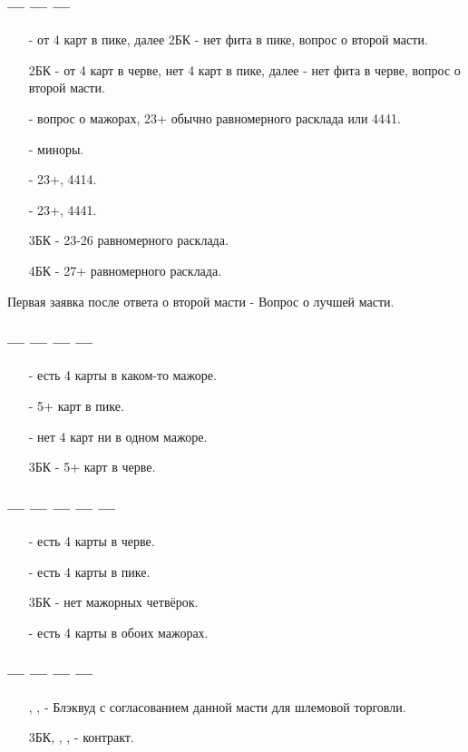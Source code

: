 \documentclass{article}
\begin{document}
\subsubsection{ ---  ---  --- }
\begin{enumerate}
    \item[\sp{2}] - от 4 карт в пике, далее 2БК - нет фита в пике, вопрос о второй масти.
    \item[2БК] - от 4 карт в черве, нет 4 карт в пике, далее  - нет фита в черве, вопрос о второй масти.
    \item[\cl{3}] - вопрос о мажорах, 23+ обычно равномерного расклада или 4441.
    \item[\di{3}] - миноры.
    \item[\he{3}] - 23+, 4\cl{}4\di{}1\he{}4\sp{}.
    \item[\sp{3}] - 23+, 4\cl{}4\di{}4\he{}1\sp{}.
    \item[3БК] - 23-26 равномерного расклада.
    \item[4БК] - 27+ равномерного расклада.
\end{enumerate}
Первая заявка после ответа о второй масти - Вопрос о лучшей масти. 
\subsubsection{ ---  ---  ---  --- }
\begin{enumerate}
    \item[\di{3}] - есть 4 карты в каком-то мажоре.
    \item[\he{3}] - 5+ карт в пике.
    \item[\sp{3}] - нет 4 карт ни в одном мажоре.
    \item[3БК] - 5+ карт в черве.
\end{enumerate}
\subsubsection{ ---  ---  ---  ---  --- }
\begin{enumerate}
    \item[\he{3}] - есть 4 карты в черве.
    \item[\sp{3}] - есть 4 карты в пике.
    \item[3БК] - нет мажорных четвёрок.
    \item[\cl{4}] - есть 4 карты в обоих мажорах.
\end{enumerate}
\subsubsection{ ---  ---  ---  --- }
\begin{enumerate}
    \item[\sp{3}, \cl{4}, \di{4}] - Блэквуд с согласованием данной масти для шлемовой торговли.
    \item[3БК, \sp{4}, \cl{5}, \di{5}] - контракт.
\end{enumerate}
\end{document}
